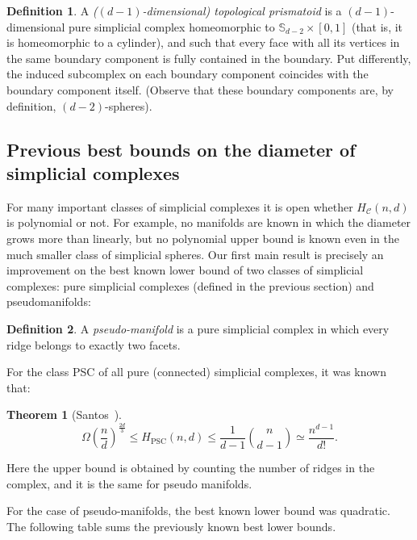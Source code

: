 \documentclass[12pt,a4paper]{article}
\newcommand{\PSC}{{\textrm{PSC}}}
\theoremstyle{plain}
\newtheorem{theorem}{Theorem}
\theoremstyle{definition}
\newtheorem{definition}{Definition}
\begin{document}
\begin{definition}
  A \emph{($(d-1)$-dimensional) topological prismatoid} is a $(d-1)$-dimensional pure simplicial complex homeomorphic to $\mathbb{S}_{d-2}\times [0,1]$ (that is, it is homeomorphic to a cylinder), and such that every face with all its vertices in the same boundary component is fully contained in the boundary. Put differently, the induced subcomplex on each boundary component coincides with the boundary component itself.
(Observe that these boundary components are, by definition, $(d-2)$-spheres).
\end{definition}

\subsection{Previous best bounds on the diameter of simplicial complexes}
For many important classes of simplicial complexes it is open whether $H_\mathcal{C}(n,d)$ is polynomial or not. For example, no manifolds are known in which the diameter grows more than linearly, but no polynomial upper bound is known even in the much smaller class of simplicial spheres.
Our first main result is precisely an improvement on the best known lower bound of two classes of simplicial complexes: pure simplicial complexes (defined in the previous section) and pseudomanifolds:

\begin{definition}
  A \emph{pseudo-manifold} is a pure simplicial complex in which every ridge belongs to exactly two facets.
\end{definition}

For the class PSC of all pure (connected) simplicial complexes, it was known that:

\begin{theorem}[Santos~]
\label{thm:Santosbound}
\[
  \Omega\left(\frac{n}{d}\right)^{\frac{2d}{3}} \le H_{\PSC}(n,d) \le \frac{1}{d-1}\binom{n}{d-1}\simeq \frac{n^{d-1}}{d!}.
\]
\end{theorem}

Here the upper bound is obtained by counting the number of ridges in the complex, and it is the same for pseudo manifolds.

For the case of pseudo-manifolds, the best known lower bound was quadratic. The following table sums the previously known best lower bounds.
\end{document}
